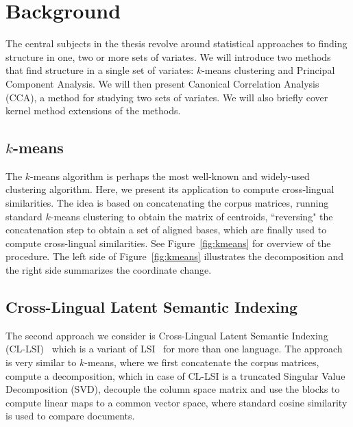 %
\chapter{Background}

The central subjects in the thesis revolve around statistical approaches to finding structure in one, two or more sets of variates. We will
introduce two methods that find structure in a single set of variates: $k$-means clustering and Principal Component Analysis. We will then present
Canonical Correlation Analysis (CCA), a method for studying two sets of variates. We will also briefly cover kernel method extensions of the methods.


\section{$k$-means}\label{sec:kmeans}

The $k$-means algorithm is perhaps the most well-known and widely-used clustering algorithm. Here, we present its application
to compute cross-lingual similarities. The idea is based on concatenating the corpus matrices, running standard $k$-means clustering to obtain the matrix of centroids, ``reversing" the concatenation step to obtain a set of aligned bases, which are finally used to compute cross-lingual similarities. See Figure~\ref{fig:kmeans} for overview of the procedure. The left side of Figure~\ref{fig:kmeans} illustrates the decomposition and the right side summarizes the coordinate change.

\section{Cross-Lingual Latent Semantic Indexing}\label{sec:LSI}

The second approach we consider is Cross-Lingual Latent Semantic Indexing (CL-LSI)~\cite{cl_lsi} which is a variant of LSI~\cite{lsi} for more than one language. The approach is very similar to $k$-means, where we first concatenate the corpus matrices, compute a decomposition, which in case of CL-LSI is a truncated Singular Value Decomposition (SVD), decouple the
 column space matrix and use the blocks to compute linear maps to a common vector space, where standard cosine similarity is used to compare documents.

